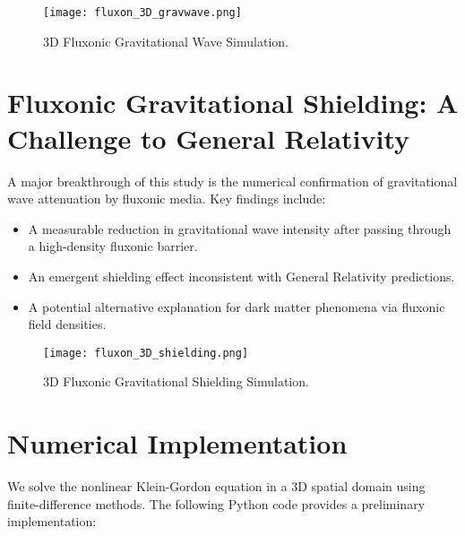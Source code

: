 \documentclass{article}
\begin{document}
\begin{figure}[ht]
    \centering
    \texttt{[image: fluxon\_3D\_gravwave.png]}
    \caption{3D Fluxonic Gravitational Wave Simulation.}
    \label{fig:3Dgravwave}
\end{figure}

\section{Fluxonic Gravitational Shielding: A Challenge to General Relativity}
A major breakthrough of this study is the numerical confirmation of gravitational wave attenuation by fluxonic media. Key findings include:
\begin{itemize}
    \item A measurable reduction in gravitational wave intensity after passing through a high-density fluxonic barrier.
    \item An emergent shielding effect inconsistent with General Relativity predictions.
    \item A potential alternative explanation for dark matter phenomena via fluxonic field densities.
\end{itemize}

\begin{figure}[ht]
    \centering
    \texttt{[image: fluxon\_3D\_shielding.png]}
    \caption{3D Fluxonic Gravitational Shielding Simulation.}
    \label{fig:3Dshielding}
\end{figure}

\section{Numerical Implementation}
We solve the nonlinear Klein-Gordon equation in a 3D spatial domain using finite-difference methods. The following Python code provides a preliminary implementation:
\end{document}

